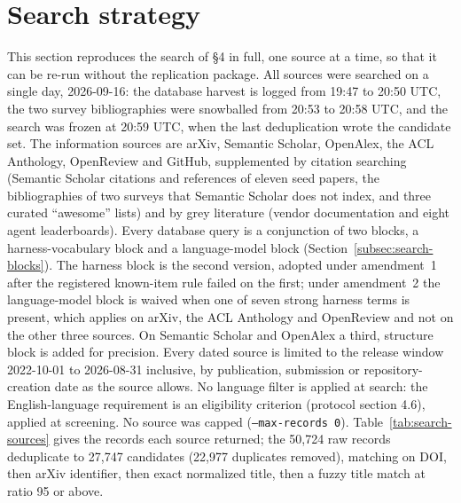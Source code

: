 \section{Search strategy}
\label{app:search}

This section reproduces the search of \S4 in full, one source at a time, so that it can be re-run
without the replication package. All sources were searched on a single day, 2026-09-16: the database
harvest is logged from 19:47 to 20:50 UTC, the two survey bibliographies were snowballed from 20:53
to 20:58 UTC, and the search was frozen at 20:59 UTC, when the last deduplication wrote the candidate
set. The information sources are arXiv, Semantic Scholar, OpenAlex, the ACL Anthology, OpenReview and
GitHub, supplemented by citation searching (Semantic Scholar citations and references of eleven seed
papers, the bibliographies of two surveys that Semantic Scholar does not index, and three curated
``awesome'' lists) and by grey literature (vendor documentation and eight agent leaderboards). Every
database query is a conjunction of two blocks, a harness-vocabulary block and a language-model block
(Section~\ref{subsec:search-blocks}). The harness block is the second version, adopted under
amendment~1 after the registered known-item rule failed on the first; under amendment~2 the
language-model block is waived when one of seven strong harness terms is present, which applies on
arXiv, the ACL Anthology and OpenReview and not on the other three sources. On Semantic Scholar and
OpenAlex a third, structure block is added for precision. Every dated source is limited to the
release window 2022-10-01 to 2026-08-31 inclusive, by publication, submission or repository-creation
date as the source allows. No language filter is applied at search: the English-language requirement
is an eligibility criterion (protocol section 4.6), applied at screening. No source was capped
(\texttt{--max-records 0}). Table~\ref{tab:search-sources} gives the records each source returned;
the 50,724 raw records deduplicate to 27,747 candidates (22,977 duplicates removed), matching on DOI,
then arXiv identifier, then exact normalized title, then a fuzzy title match at ratio 95 or above.

